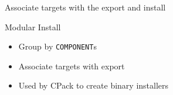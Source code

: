 \documentclass{beamer}
\begin{document}
\begin{frame}[fragile]{Associate targets with the export and install}%
	\vspace{1cm}
	
	
	\begin{block}{\small Modular Install}
		\begin{itemize}\small%
			\item Group by \texttt{COMPONENT}s%
			\item Associate targets with export
			\item Used by CPack to create binary installers
		\end{itemize}
	\end{block}
\end{frame}
\end{document}
